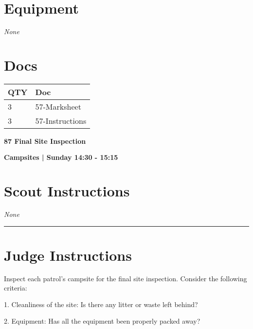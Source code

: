 \documentclass[10pt]{article}
\newcommand{\newtitle}[1]{\begin{center}{\Huge\bfseries #1 }\\ \vspace{5mm}\end{center}}
\newcommand{\newsubtitle}[1]{\begin{center}{\color{grey}\Large\bfseries #1 }\\ \vspace{5mm}\end{center}}
\begin{document}
	\begin{multicols}{2}

		\section*{\faWrench \: Equipment}

				\textit{None}
		
		\vfill\null
		\columnbreak

			\section*{\faFile \: Docs}
		 	\begin{center}
			\begin{tabular}{p{2cm}p{4cm}}

			\textbf{QTY} & \textbf{Doc} \\\toprule
										3&57-Marksheet\\\midrule
										3&57-Instructions\\\midrule
							\end{tabular}
			\end{center}
	

		\vfill\null

		\end{multicols}



	\vspace{1cm}


	\clearpage
		\newtitle{87 Final Site Inspection }
	\newsubtitle{Campsites | Sunday 14:30 - 15:15}
		\setcounter{section}{86}
	\section*{Scout Instructions}
		\textit{None}
	
	\vspace{0.5cm}
	\hrule
	\vspace{0.5cm}

		\section*{Judge Instructions}
		Inspect each patrol's campsite for the final site inspection. Consider the following criteria:



1. Cleanliness of the site: Is there any litter or waste left behind?

2. Equipment: Has all the equipment been properly packed away?
\end{document}
